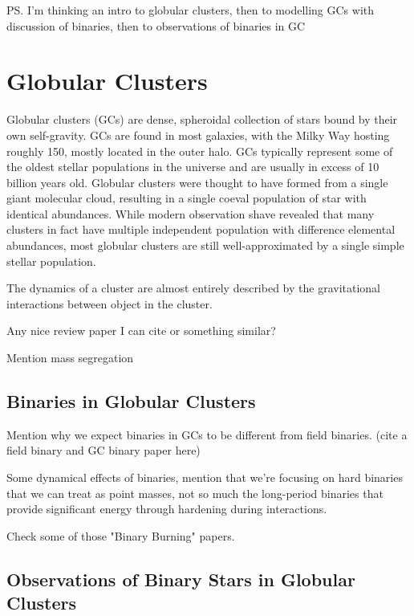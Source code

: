 








\ps{I'm thinking an intro to globular clusters, then to modelling GCs with discussion of binaries,
	then to observations of binaries in GC}

\section{Globular Clusters}

Globular clusters (GCs) are dense, spheroidal collection of stars bound by their own self-gravity.
GCs are found in most galaxies, with the Milky Way hosting roughly 150, mostly located in the outer
halo. GCs typically represent some of the oldest stellar populations in the universe and are usually
in excess of 10 billion years old. Globular clusters were thought to have formed from a single giant
molecular cloud, resulting in a single coeval population of star with identical abundances. While
modern observation shave revealed that many clusters in fact have multiple independent population
with difference elemental abundances, most globular clusters are still well-approximated by a single
simple stellar population. 

The dynamics of a cluster are almost entirely described by the gravitational interactions between
object in the cluster. 

Any nice review paper I can cite or something similar?

Mention mass segregation

\subsection{Binaries in Globular Clusters}

Mention why we expect binaries in GCs to be different from field binaries. (cite a field binary and GC binary paper here)

Some dynamical effects of binaries, mention that we're focusing on hard binaries that we can treat
as point masses, not so much the long-period binaries that provide significant energy through
hardening during interactions.

Check some of those "Binary Burning" papers.

\subsection{Observations of Binary Stars in Globular Clusters}

